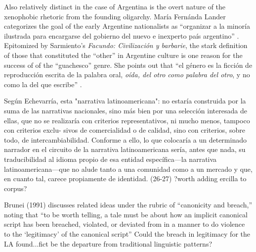 \documentclass[12pt]{report}
\begin{document}
Also relatively distinct in the case of Argentina is the overt nature of the xenophobic rhetoric from the founding oligarchy.
María Fernánda Lander categorizes the goal of the early Argentine nationalists as \enquote{organizar a la minoría ilustrada para encargarse del gobierno del nuevo e inexperto país argentino} \autocite[44]{Lander2010}.
Epitomized by Sarmiento's \textit{Facundo: Civilización y barbarie}, the stark definition of those that constituted the \enquote{other} in Argentine culture is one reason for the success of of the \enquote{guachesco} genre.
She points out that \enquote{el género es la ficción de reproducción escrita de la palabra oral, \textit{oída, del otro como palabra del otro}, y no como la del que escribe} \autocite[emphasis added][30]{Ludmer1991}.



Según Echevarría, esta "narrativa  latinoamericana":
no  estaría  construida  por  la  suma  de  las  narrativas  nacionales,  sino
más bien por  una selección  interesada de ellas, que no se realizaría  con
criterios representativos, ni mucho  menos, tampoco con criterios exclu-
sivos de comercialidad  o de calidad,  sino  con  criterios, sobre  todo,  de
intercambiabilidad.  Conforme  a ello, lo que colocaría a un  determinado
narrador  en  el circuito  de la narrativa  latinoamericana  sería, antes  que
nada,  su  traducibilidad  al idioma  propio  de esa entidad  específica—la
narrativa latinoamericana—que  no alude tanto a una comunidad  como
a  un  mercado  y que,  en  cuanto  tal, carece  propiamente  de  identidad.
(26-27)
?worth adding ercilla to corpus?


Brunei (1991) discusses related ideas under the rubric of “canonicity
and breach,” noting that “to be worth telling, a tale must be about how
an implicit canonical script has been breached, violated, or deviated from
in a manner to do violence to the ‘legitimacy’ of the canonical script” \cite[239]{Herman}
Could the breach in legitimacy for the LA found...fict be the departure from traditional linguistic patterns?




\makeworkscited
\end{document}

